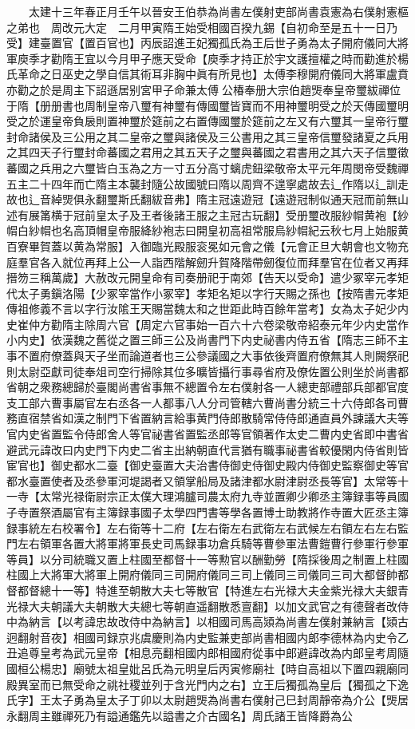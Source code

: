 　　太建十三年春正月壬午以晉安王伯恭為尚書左僕射吏部尚書袁憲為右僕射憲樞之弟也　周改元大定　二月甲寅隋王始受相國百揆九錫【自初命至是五十一日乃受】建臺置官【置百官也】丙辰詔進王妃獨孤氏為王后世子勇為太子開府儀同大將軍庾季才勸隋王宜以今月甲子應天受命【庾季才持正於宇文護擅權之時而勸進於楊氏革命之日巫史之學自信其術耳非胸中眞有所見也】太傅李穆開府儀同大將軍盧賁亦勸之於是周主下詔遜居别宮甲子命兼太傅公椿奉册大宗伯趙煚奉皇帝璽紱禪位于隋【册册書也周制皇帝八璽有神璽有傳國璽皆寶而不用神璽明受之於天傳國璽明受之於運皇帝負扆則置神璽於筵前之右置傳國璽於筵前之左又有六璽其一皇帝行璽封命諸侯及三公用之其二皇帝之璽與諸侯及三公書用之其三皇帝信璽發諸夏之兵用之其四天子行璽封命蕃國之君用之其五天子之璽與蕃國之君書用之其六天子信璽徵蕃國之兵用之六璽皆白玉為之方一寸五分高寸螭虎鈕梁敬帝太平元年周閔帝受魏禪五主二十四年而亡隋主本襲封隨公故國號曰隋以周齊不遑寧處故去辶作隋以辶訓走故也辶音綽煚俱永翻璽斯氏翻紱音弗】隋主冠遠遊冠【遠遊冠制似通天冠而前無山述有展筩横于冠前皇太子及王者後諸王服之主冠古玩翻】受册璽改服紗㡌黄袍【紗㡌白紗㡌也名高頂帽皇帝服絳紗袍志曰開皇初高祖常服烏紗㡌紀云秋七月上始服黄百寮畢賀蓋以黄為常服】入御臨光殿服衮冕如元會之儀【元會正旦大朝會也文物充庭羣官各入就位再拜上公一人詣西階解劒升賀降階帶劒復位而拜羣官在位者又再拜搢笏三稱萬歲】大赦改元開皇命有司奏册祀于南郊【告天以受命】遣少冢宰元孝矩代太子勇鎭洛陽【少冢宰當作小冢宰】孝矩名矩以字行天賜之孫也【按隋書元孝矩傳祖修義不言以字行汝隂王天賜當魏太和之世距此時百餘年當考】女為太子妃少内史崔仲方勸隋主除周六官【周定六官事始一百六十六卷梁敬帝紹泰元年少内史當作小内史】依漢魏之舊從之置三師三公及尚書門下内史祕書内侍五省【隋志三師不主事不置府僚蓋與天子坐而論道者也三公參議國之大事依後齊置府僚無其人則闕祭祀則太尉亞獻司徒奉俎司空行掃除其位多曠皆攝行事尋省府及僚佐置公則坐於尚書都省朝之衆務總歸於臺閣尚書省事無不總置令左右僕射各一人總吏部禮部兵部都官度支工部六曹事屬官左右丞各一人都事八人分司管轄六曹尚書分統三十六侍郎各司曹務直宿禁省如漢之制門下省置納言給事黄門侍郎散騎常侍侍郎通直員外諫議大夫等官内史省置監令侍郎舍人等官祕書省置監丞郎等官領著作太史二曹内史省即中書省避武元諱改曰内史門下内史二省主出納朝直代言猶有職事祕書省較優閑内侍省則皆宦官也】御史都水二臺【御史臺置大夫治書侍御史侍御史殿内侍御史監察御史等官都水臺置使者及丞參軍河堤謁者又領掌船局及諸津都水尉津尉丞長等官】太常等十一寺【太常光禄衛尉宗正太僕大理鴻臚司農太府九寺並置卿少卿丞主簿録事等員國子寺置祭酒屬官有主簿録事國子太學四門書等學各置博士助教將作寺置大匠丞主簿録事統左右校署令】左右衛等十二府【左右衛左右武衛左右武候左右領左右左右監門左右領軍各置大將軍將軍長史司馬録事功倉兵騎等曹參軍法曹鎧曹行參軍行參軍等員】以分司統職又置上柱國至都督十一等勲官以酬勤勞【隋採後周之制置上柱國柱國上大將軍大將軍上開府儀同三司開府儀同三司上儀同三司儀同三司大都督帥都督都督總十一等】特進至朝散大夫七等散官【特進左右光禄大夫金紫光禄大夫銀青光禄大夫朝議大夫朝散大夫總七等朝直遥翻散悉亶翻】以加文武官之有德聲者改侍中為納言【以考諱忠故改侍中為納言】以相國司馬高熲為尚書左僕射兼納言【熲古迥翻射音夜】相國司録京兆虞慶則為内史監兼吏部尚書相國内郎李德林為内史令乙丑追尊皇考為武元皇帝【相息亮翻相國内郎相國府從事中郎避諱改為内郎皇考周隨國桓公楊忠】廟號太祖皇妣呂氏為元明皇后丙寅修廟社【時自高祖以下置四親廟同殿異室而已無受命之祧社稷並列于含光門内之右】立王后獨孤為皇后【獨孤之下逸氏字】王太子勇為皇太子丁卯以太尉趙煚為尚書右僕射己巳封周靜帝為介公【煚居永翻周主雖禪死乃有謚通鑑先以謚書之介古國名】周氏諸王皆降爵為公